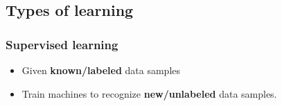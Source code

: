 \subsection{Types of learning}
    \subsubsection{Supervised learning}
    \begin{definition}
        \begin{itemize}
            \item Given \textbf{known/labeled} data samples
            \item Train machines to recognize \textbf{new/unlabeled} data samples.
        \end{itemize}
    \end{definition}

